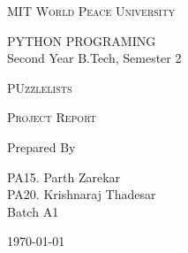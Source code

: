 \documentclass[16pt]{article}
\begin{document}
\begin{titlepage}
	\centering


	\huge\textsc{
		MIT World Peace University
	}\\

	\vspace{1\baselineskip} %

	\LARGE{
		PYTHON PROGRAMING \\
		Second Year B.Tech, Semester 2
	}

	\vfill %


	\vspace{3\baselineskip} %



	\huge{\textsc{
            PUzzlelists 
    }} \\




	\vspace{7\baselineskip} %


	\LARGE\textsc{
		Project Report
			} %
	\vfill


	Prepared By
	\vspace{0.5\baselineskip} %

	\Large{
		PA15. Parth Zarekar\\
        PA20. Krishnaraj Thadesar\\
		\vspace{1cm}
		Batch A1
	}


	\vspace{0.5\baselineskip} %
	\today

\end{titlepage}
\end{document}

